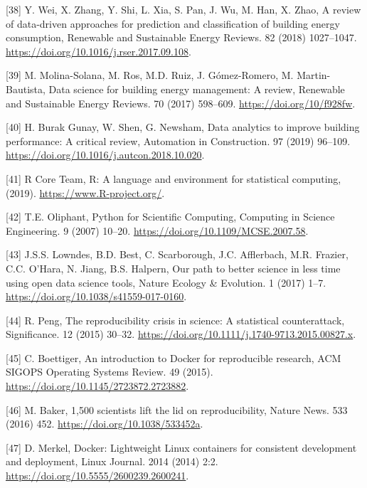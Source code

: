 \documentclass[3p, times]{elsarticle} %
\begin{document}
\leavevmode\hypertarget{ref-Wei2018review}{}%
{[}38{]} Y. Wei, X. Zhang, Y. Shi, L. Xia, S. Pan, J. Wu, M. Han, X. Zhao, A review of data-driven approaches for prediction and classification of building energy consumption, Renewable and Sustainable Energy Reviews. 82 (2018) 1027--1047. \url{https://doi.org/10.1016/j.rser.2017.09.108}.

\leavevmode\hypertarget{ref-Molina-Solana2017}{}%
{[}39{]} M. Molina-Solana, M. Ros, M.D. Ruiz, J. Gómez-Romero, M. Martin-Bautista, Data science for building energy management: A review, Renewable and Sustainable Energy Reviews. 70 (2017) 598--609. \url{https://doi.org/10/f928fw}.

\leavevmode\hypertarget{ref-BurakGunay2019}{}%
{[}40{]} H. Burak Gunay, W. Shen, G. Newsham, Data analytics to improve building performance: A critical review, Automation in Construction. 97 (2019) 96--109. \url{https://doi.org/10.1016/j.autcon.2018.10.020}.

\leavevmode\hypertarget{ref-RCoreTeam2019}{}%
{[}41{]} R Core Team, R: A language and environment for statistical computing, (2019). \url{https://www.R-project.org/}.

\leavevmode\hypertarget{ref-Oliphant2007}{}%
{[}42{]} T.E. Oliphant, Python for Scientific Computing, Computing in Science Engineering. 9 (2007) 10--20. \url{https://doi.org/10.1109/MCSE.2007.58}.

\leavevmode\hypertarget{ref-Lowndes2017}{}%
{[}43{]} J.S.S. Lowndes, B.D. Best, C. Scarborough, J.C. Afflerbach, M.R. Frazier, C.C. O'Hara, N. Jiang, B.S. Halpern, Our path to better science in less time using open data science tools, Nature Ecology \& Evolution. 1 (2017) 1--7. \url{https://doi.org/10.1038/s41559-017-0160}.

\leavevmode\hypertarget{ref-Peng2015}{}%
{[}44{]} R. Peng, The reproducibility crisis in science: A statistical counterattack, Significance. 12 (2015) 30--32. \url{https://doi.org/10.1111/j.1740-9713.2015.00827.x}.

\leavevmode\hypertarget{ref-Boettiger2015}{}%
{[}45{]} C. Boettiger, An introduction to Docker for reproducible research, ACM SIGOPS Operating Systems Review. 49 (2015). \url{https://doi.org/10.1145/2723872.2723882}.

\leavevmode\hypertarget{ref-Baker2016a}{}%
{[}46{]} M. Baker, 1,500 scientists lift the lid on reproducibility, Nature News. 533 (2016) 452. \url{https://doi.org/10.1038/533452a}.

\leavevmode\hypertarget{ref-Merkel2014}{}%
{[}47{]} D. Merkel, Docker: Lightweight Linux containers for consistent development and deployment, Linux Journal. 2014 (2014) 2:2. \url{https://doi.org/10.5555/2600239.2600241}.
\end{document}
